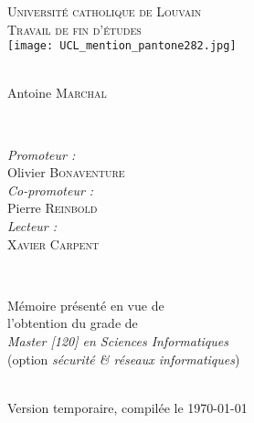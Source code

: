 \documentclass[a4paper, twoside, 12pt,french]{report}
\begin{document}
\begin{titlepage}
\center

\textsc{\LARGE Université catholique de Louvain}\\[1cm]
\textsc{\Large Travail de fin d'études}\\[2cm]

\texttt{[image: UCL\_mention\_pantone282.jpg]}\\[1.5cm]

\textsc{\Large }\\[1.5cm]

\begin{minipage}{0.4\textwidth}
\begin{center}
\large Antoine \textsc{Marchal}
\end{center}
\end{minipage}\\[3cm]

\begin{minipage}{0.4\textwidth}
\begin{flushleft} \large
\emph{Promoteur :} \\
Olivier \textsc{Bonaventure}\\
\emph{Co-promoteur :} \\
Pierre \textsc{Reinbold}\\
\emph{Lecteur :} \\
\textsc{Xavier Carpent}
\end{flushleft}
\end{minipage}
~
\begin{minipage}{0.5\textwidth}
\begin{flushright} \large
{\normalsize Mémoire présenté en vue de\\
l'obtention du grade de\\
\emph{Master [120] en Sciences Informatiques}\\
(option \emph{sécurité \& réseaux informatiques})}
\end{flushright}
\end{minipage}\\[1.5cm]


{\huge Version temporaire, compilée le \today}

\end{titlepage}

\pagestyle{empty} %
\tableofcontents
\restoregeometry
\clearpage %
\pagestyle{fancy}












%



\end{document}
